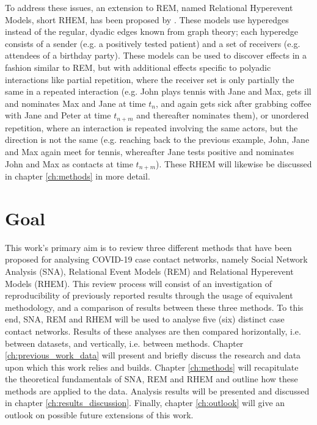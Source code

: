 To address these issues, an extension to REM, named Relational Hyperevent Models, short RHEM, has been proposed by \cite{lerner2019rem}. These models use hyperedges instead of the regular, dyadic edges known from graph theory; each hyperedge consists of a sender (e.g. a positively tested patient) and a set of receivers (e.g. attendees of a birthday party). These models can be used to discover effects in a fashion similar to REM, but with additional effects specific to polyadic interactions like partial repetition, where the receiver set is only partially the same in a repeated interaction (e.g. John plays tennis with Jane and Max, gets ill and nominates Max and Jane at time $t_n$, and again gets sick after grabbing coffee with Jane and Peter at time $t_{n+m}$ and thereafter nominates them), or unordered repetition, where an interaction is repeated involving the same actors, but the direction is not the same (e.g. reaching back to the previous example, John, Jane and Max again meet for tennis, whereafter Jane tests positive and nominates John and Max as contacts at time $t_{n+m}$). These RHEM will likewise be discussed in chapter \ref{ch:methods} in more detail.

\section{Goal}
\label{sec:intro_goal}

This work's primary aim is to review three different methods that have been proposed for analysing COVID-19 case contact networks, namely Social Network Analysis (SNA), Relational Event Models (REM) and Relational Hyperevent Models (RHEM). This review process will consist of an investigation of reproducibility of previously reported results through the usage of equivalent methodology, and a comparison of results between these three methods. To this end, SNA, REM and RHEM will be used to analyse five (six) distinct case contact networks. Results of these analyses are then compared horizontally, i.e. between datasets, and vertically, i.e. between methods. Chapter \ref{ch:previous_work_data} will present and briefly discuss the research and data upon which this work relies and builds. Chapter \ref{ch:methods} will recapitulate the theoretical fundamentals of SNA, REM and RHEM and outline how these methods are applied to the data. Analysis results will be presented and discussed in chapter \ref{ch:results_discussion}. Finally, chapter \ref{ch:outlook} will give an outlook on possible future extensions of this work.